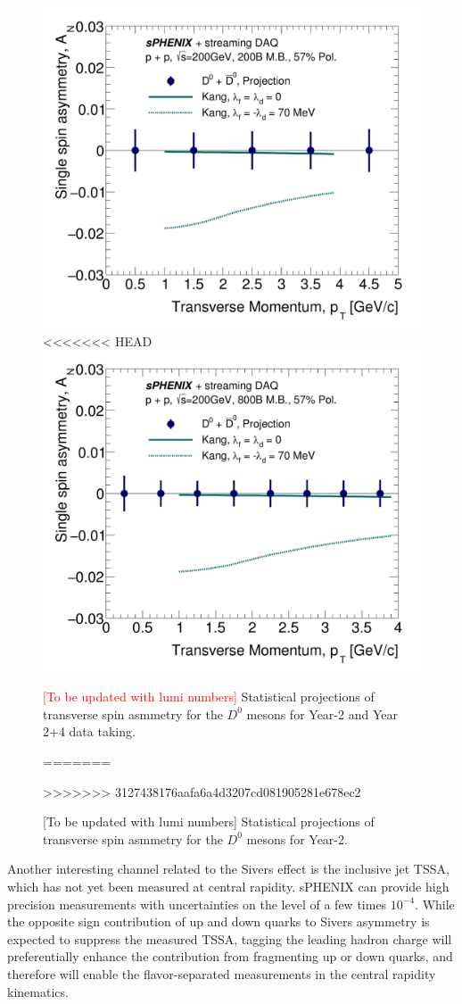 \begin{figure}[htbp]
\begin{center}
\includegraphics[width=.49\linewidth]{figs/RAA_DB_theory_root_AN_D0D0bar_pp200B.pdf}
<<<<<<< HEAD
\includegraphics[width=.49\linewidth]{figs/RAA_DB_theory_root_AN_D0D0bar.pdf}
\caption{{\textcolor{red}{[To be updated with lumi numbers]}} Statistical projections of
  transverse spin asmmetry for the $D^0$ mesons for Year-2 and Year
  2+4 data taking.} 
=======
\caption{[To be updated with lumi numbers] Statistical projections of
  transverse spin asmmetry for the $D^0$ mesons for Year-2.} 
>>>>>>> 3127438176aafa6a4d3207cd081905281e678ec2
\label{fig:AN-D0}
\end{center}
\end{figure}

Another interesting channel related to the Sivers effect is the inclusive jet TSSA, which has not yet been measured at central rapidity. sPHENIX can provide high precision measurements with uncertainties on the level of a few times $10^{-4}$. While the opposite sign contribution of up and down quarks to Sivers asymmetry is expected to suppress the measured TSSA, tagging the leading hadron charge will preferentially enhance the contribution from fragmenting up or down quarks, and therefore will enable the flavor-separated measurements in the central rapidity kinematics.

